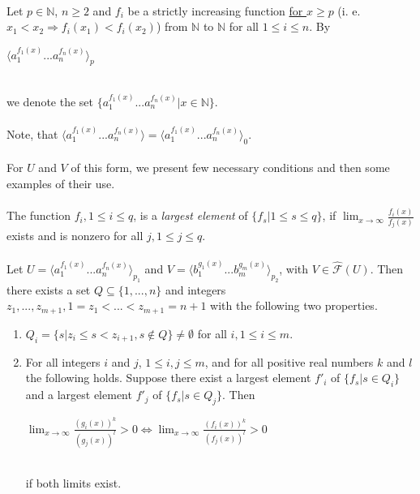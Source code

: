 \paragraph{}
\oznacenie Let $p \in \mathbb{N}$, $n \geq 2$ and $f_{i}$ be a strictly increasing function \underline{for $x \geq p$} (i. e. $x_{1} < x_{2} \Rightarrow f_{i}(x_{1}) < f_{i}(x_{2})$) from $\mathbb{N} $ to $\mathbb{N} $ for all $ 1 \leq i \leq n$. By \\
\centerline{$\langle a_{1}^{f_{1}(x)}...a_{n}^{f_{n}(x)} \rangle_{p} $} \\
we denote the set $\{ a_{1}^{f_{1}(x)}...a_{n}^{f_{n}(x)} | x \in \mathbb{N} \} $.

\paragraph{}
Note, that $\langle a_{1}^{f_{1}(x)}...a_{n}^{f_{n}(x)} \rangle = \langle a_{1}^{f_{1}(x)}...a_{n}^{f_{n}(x)} \rangle_{0} $.

\paragraph{}
For $U$ and $V$ of this form, we present few necessary conditions and then some examples of their use.

\paragraph{}
\oznacenie The function $f_{i}, 1 \leq i \leq q$, is a \emph{largest element} of $\{ f_{s} | 1 \leq s \leq q \}$, if $\lim_{x\to \infty}\frac{f_{i}(x)}{f_{j}(x)}$ exists and is nonzero for all $j, 1 \leq j \leq q$.

\paragraph{}
\cveta Let $U = \langle a_{1}^{f_{1}(x)}...a_{n}^{f_{n}(x)} \rangle_{p_{1}} $ and $V = \langle b_{1}^{g_{1}(x)}...b_{m}^{g_{m}(x)} \rangle_{p_{2}} $, with $V \in \hat{\mathcal{F}}(U) $. Then there exists a set $Q \subseteq \{ 1, ..., n \} $ and integers $z_{1}, ..., z_{m+1}, 1=z_{1} < ... < z_{m+1} = n+1 $ with the following two properties.
\begin{enumerate}
\item $Q_{i} = \{ s | z_{i} \leq s < z_{i+1}, s \notin Q \} \neq \emptyset $ for all $i, 1 \leq i \leq m$.
\item For all integers $i$ and $j$, $1 \leq i, j \leq m$, and for all positive real numbers $k$ and $l$ the following holds. Suppose there exist a largest element $f'_{i}$ of $\{ f_{s} | s \in Q_{i} \} $ and a largest element $f'_{j}$ of $\{ f_{s} | s \in Q_{j} \} $. Then \\
\centerline{$\lim_{x \to \infty}\frac{(g_{i}(x))^{k}}{(g_{j}(x))^{l}} > 0 \Leftrightarrow \lim_{x \to \infty}\frac{(f_{i}(x))^{k}}{(f_{j}(x))^{l}} > 0$} \\
if both limits exist.
\end{enumerate} 

